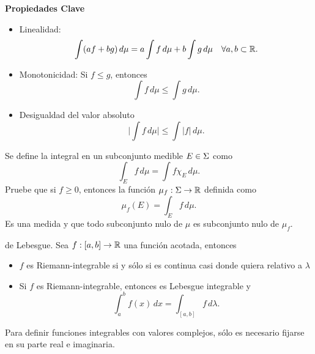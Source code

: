 \documentclass[main.tex]{subfiles}
\begin{document}
\noindent\textbf{Propiedades Clave}
\begin{itemize}
    \item Linealidad:
      \[
      \int (af + bg) \, d\mu = a\int f \, d\mu + b\int g \, d\mu\quad\forall{a,b}\subset\mathbb R .
      \]
    \item Monotonicidad: Si $f \leq g$, entonces
      \[
      \int f \, d\mu \leq \int g \, d\mu.
      \]
    \item Desigualdad del valor absoluto
      \[
      \Big|\int f \, d\mu\Big| \leq \int |f| \, d\mu.
      \]
\end{itemize}

\exe Se define la integral en un subconjunto medible $E\in\Sigma$ como
\[
\int_E f \, d\mu = \int f\chi_E\,d\mu.
\]
Pruebe que si $f\geq 0$, entonces la función $\mu_f:\Sigma\to\mathbb R $ definida como
\[
\mu_f(E)=\int_E f \, d\mu.
\]
Es una medida y que todo subconjunto nulo de $\mu$ es subconjunto nulo de $\mu_f$.
\begin{teorema}{de Lebesgue.}
Sea $f:[a,b]\to\mathbb R $ una función acotada, entonces
\begin{itemize}
  \item $f$ es Riemann-integrable si y sólo si es continua casi donde quiera relativo a $\lambda$
  \item  Si $f$ es Riemann-integrable, entonces es Lebesgue integrable y
\[
\int_a^b f(x) \, dx=\int_{[a,b]} f \, d\lambda.
\]
  \end{itemize}
\end{teorema}
\obs Para definir funciones integrables con valores complejos, sólo es necesario fijarse en su parte real e imaginaria.
\end{document}
